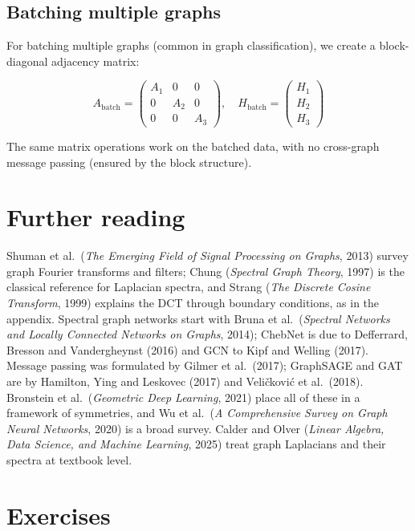 \begin{notechapter}
\subsection{Batching multiple graphs}

For batching multiple graphs (common in graph classification), we
create a block-diagonal adjacency matrix:

\[
A_{\text{batch}} = \begin{pmatrix}
A_1 & 0 & 0 \\
0 & A_2 & 0 \\
0 & 0 & A_3
\end{pmatrix}, \quad
H_{\text{batch}} = \begin{pmatrix}
H_1 \\ H_2 \\ H_3
\end{pmatrix}
\]

The same matrix operations work on the batched data, with no
cross-graph message passing (ensured by the block structure).

\section*{Further reading}
Shuman et al.\ (\emph{The Emerging Field of Signal Processing on Graphs}, 2013) survey graph Fourier transforms and filters; Chung (\emph{Spectral Graph Theory}, 1997) is the classical reference for Laplacian spectra, and Strang (\emph{The Discrete Cosine Transform}, 1999) explains the DCT through boundary conditions, as in the appendix. Spectral graph networks start with Bruna et al.\ (\emph{Spectral Networks and Locally Connected Networks on Graphs}, 2014); ChebNet is due to Defferrard, Bresson and Vandergheynst (2016) and GCN to Kipf and Welling (2017). Message passing was formulated by Gilmer et al.\ (2017); GraphSAGE and GAT are by Hamilton, Ying and Leskovec (2017) and Veličković et al.\ (2018). Bronstein et al.\ (\emph{Geometric Deep Learning}, 2021) place all of these in a framework of symmetries, and Wu et al.\ (\emph{A Comprehensive Survey on Graph Neural Networks}, 2020) is a broad survey. Calder and Olver (\emph{Linear Algebra, Data Science, and Machine Learning}, 2025) treat graph Laplacians and their spectra at textbook level.


\section*{Exercises}


\end{notechapter}
